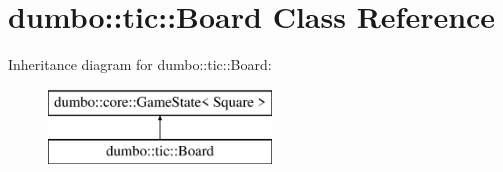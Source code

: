 \hypertarget{classdumbo_1_1tic_1_1_board}{\section{dumbo\-:\-:tic\-:\-:Board Class Reference}
\label{classdumbo_1_1tic_1_1_board}
}
Inheritance diagram for dumbo\-:\-:tic\-:\-:Board\-:\begin{figure}[H]
\begin{center}
\leavevmode
\includegraphics[height=2.000000cm]{classdumbo_1_1tic_1_1_board}
\end{center}
\end{figure}
